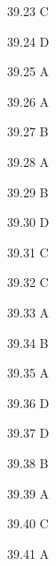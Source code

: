 \begin{Solution}{39.{23}}
C
\end{Solution}
\begin{Solution}{39.{24}}
D
\end{Solution}
\begin{Solution}{39.{25}}
A
\end{Solution}
\begin{Solution}{39.{26}}
A
\end{Solution}
\begin{Solution}{39.{27}}
B
\end{Solution}
\begin{Solution}{39.{28}}
A
\end{Solution}
\begin{Solution}{39.{29}}
B
\end{Solution}
\begin{Solution}{39.{30}}
D
\end{Solution}
\begin{Solution}{39.{31}}
C
\end{Solution}
\begin{Solution}{39.{32}}
C
\end{Solution}
\begin{Solution}{39.{33}}
A
\end{Solution}
\begin{Solution}{39.{34}}
B
\end{Solution}
\begin{Solution}{39.{35}}
A
\end{Solution}
\begin{Solution}{39.{36}}
D
\end{Solution}
\begin{Solution}{39.{37}}
D
\end{Solution}
\begin{Solution}{39.{38}}
B
\end{Solution}
\begin{Solution}{39.{39}}
A
\end{Solution}
\begin{Solution}{39.{40}}
C
\end{Solution}
\begin{Solution}{39.{41}}
A
\end{Solution}
